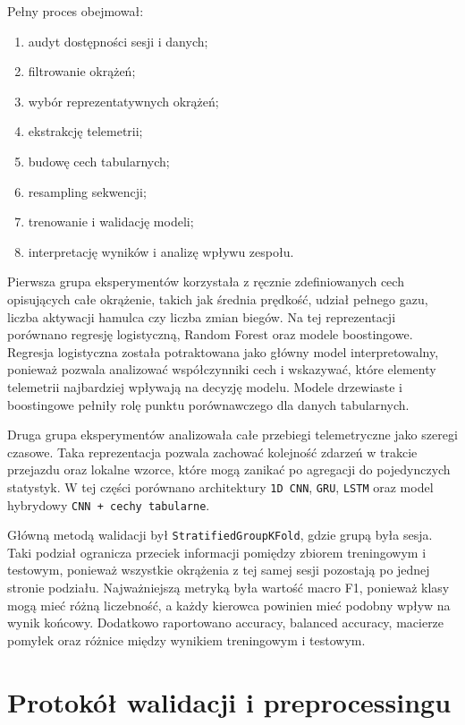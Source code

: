 \documentclass[printmode,pl]{mgr}
\begin{document}
Pełny proces obejmował:

\begin{enumerate}
    \item audyt dostępności sesji i danych;
    \item filtrowanie okrążeń;
    \item wybór reprezentatywnych okrążeń;
    \item ekstrakcję telemetrii;
    \item budowę cech tabularnych;
    \item resampling sekwencji;
    \item trenowanie i walidację modeli;
    \item interpretację wyników i analizę wpływu zespołu.
\end{enumerate}

Pierwsza grupa eksperymentów korzystała z ręcznie zdefiniowanych cech opisujących całe okrążenie, takich jak średnia prędkość, udział pełnego gazu, liczba aktywacji hamulca czy liczba zmian biegów. Na tej reprezentacji porównano regresję logistyczną, Random Forest oraz modele boostingowe. Regresja logistyczna została potraktowana jako główny model interpretowalny, ponieważ pozwala analizować współczynniki cech i wskazywać, które elementy telemetrii najbardziej wpływają na decyzję modelu. Modele drzewiaste i boostingowe pełniły rolę punktu porównawczego dla danych tabularnych.

Druga grupa eksperymentów analizowała całe przebiegi telemetryczne jako szeregi czasowe. Taka reprezentacja pozwala zachować kolejność zdarzeń w trakcie przejazdu oraz lokalne wzorce, które mogą zanikać po agregacji do pojedynczych statystyk. W tej części porównano architektury \texttt{1D CNN}, \texttt{GRU}, \texttt{LSTM} oraz model hybrydowy \texttt{CNN + cechy tabularne}.

Główną metodą walidacji był \texttt{StratifiedGroupKFold}, gdzie grupą była sesja. Taki podział ogranicza przeciek informacji pomiędzy zbiorem treningowym i testowym, ponieważ wszystkie okrążenia z tej samej sesji pozostają po jednej stronie podziału. Najważniejszą metryką była wartość macro F1, ponieważ klasy mogą mieć różną liczebność, a każdy kierowca powinien mieć podobny wpływ na wynik końcowy. Dodatkowo raportowano accuracy, balanced accuracy, macierze pomyłek oraz różnice między wynikiem treningowym i testowym.

\section{Protokół walidacji i preprocessingu}
\end{document}
